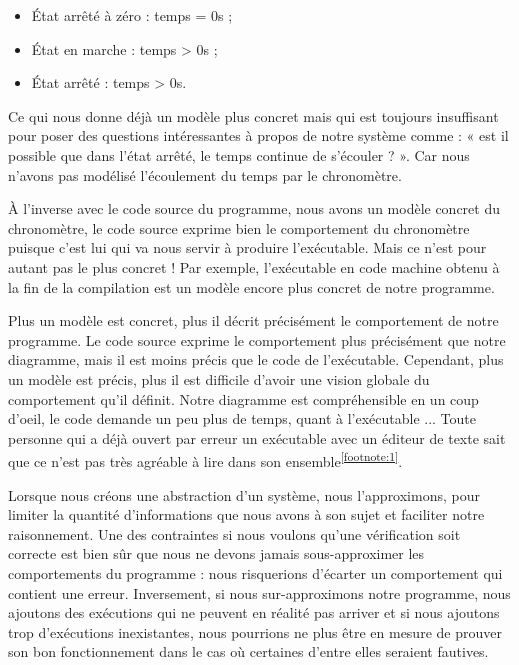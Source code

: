 \begin{itemize}
\item État arrêté à zéro : temps = 0s ;
\item État en marche : temps > 0s ;
\item État arrêté : temps > 0s.
\end{itemize}


Ce qui nous donne déjà un modèle plus concret mais qui est toujours insuffisant 
pour poser des questions intéressantes à propos de notre système comme : « est il 
possible que dans l'état arrêté, le temps continue de s'écouler ? ». Car nous
n'avons pas modélisé l'écoulement du temps par le chronomètre.



À l'inverse avec le code source du programme, nous avons un modèle concret du
chronomètre, le code source exprime bien le comportement du chronomètre puisque
c'est lui qui va nous servir à produire l'exécutable. Mais ce n'est pour autant
pas le plus concret ! Par exemple, l'exécutable en code machine obtenu à la fin
de la compilation est un modèle encore plus concret de notre programme.



Plus un modèle est concret, plus il décrit précisément le comportement de notre
programme. Le code source exprime le comportement plus précisément que notre 
diagramme, mais il est moins précis que le code de l'exécutable. Cependant, plus
un modèle est précis, plus il est difficile d'avoir une vision globale du 
comportement qu'il définit. Notre diagramme est compréhensible en un coup d'oeil,
le code demande un peu plus de temps, quant à l'exécutable ... Toute personne qui
a déjà ouvert par erreur un exécutable avec un éditeur de texte sait que ce n'est
pas très agréable à lire dans son ensemble\textsuperscript{\ref{footnote:1}}.



Lorsque nous créons une abstraction d'un système, nous l'approximons, pour limiter
la quantité d'informations que nous avons à son sujet et faciliter notre 
raisonnement. Une des contraintes si nous voulons qu'une vérification soit 
correcte est bien sûr que nous ne devons jamais sous-approximer les comportements 
du programme : nous risquerions d'écarter un comportement qui contient une erreur.
Inversement, si nous sur-approximons notre programme, nous ajoutons des exécutions
qui ne peuvent en réalité pas arriver et si nous ajoutons trop d'exécutions 
inexistantes, nous pourrions ne plus être en mesure de prouver son bon 
fonctionnement dans le cas où certaines d'entre elles seraient fautives.




